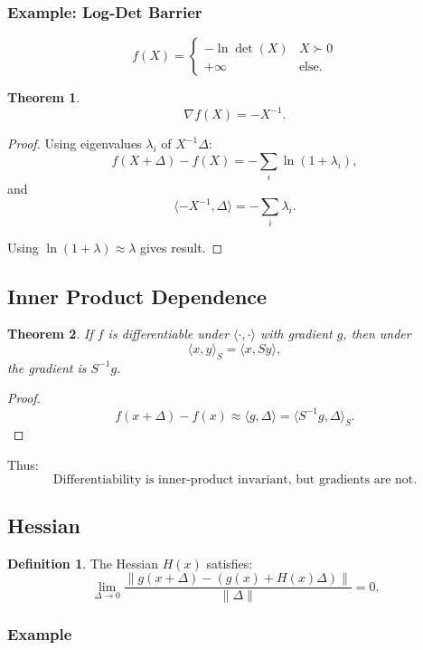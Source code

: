 \documentclass[12pt,oneside]{book}
\numberwithin{equation}{section}
\theoremstyle{definition}
\newtheorem{definition}{Definition}[section]
\theoremstyle{plain}
\newtheorem{theorem}{Theorem}[section]
\theoremstyle{remark}
\begin{document}
\subsubsection*{Example: Log-Det Barrier}

\[
f(X) =
\begin{cases}
-\ln \det(X) & X \succ 0 \\
+\infty & \text{else}.
\end{cases}
\]

\begin{theorem}
\[
\nabla f(X) = -X^{-1}.
\]
\end{theorem}

\begin{proof}
Using eigenvalues $\lambda_i$ of $X^{-1}\Delta$:
\[
f(X+\Delta) - f(X)
= -\sum_i \ln(1+\lambda_i),
\]
and
\[
\langle -X^{-1}, \Delta \rangle = -\sum_i \lambda_i.
\]

Using $\ln(1+\lambda) \approx \lambda$ gives result.
\end{proof}

\subsection*{Inner Product Dependence}

\begin{theorem}
If $f$ is differentiable under $\langle \cdot,\cdot \rangle$ with gradient $g$, then under
\[
\langle x,y \rangle_S = \langle x, S y \rangle,
\]
the gradient is $S^{-1} g$.
\end{theorem}

\begin{proof}
\[
f(x+\Delta) - f(x) \approx \langle g,\Delta \rangle
= \langle S^{-1} g, \Delta \rangle_S.
\]
\end{proof}

\noindent
Thus:
\[
\text{Differentiability is inner-product invariant, but gradients are not.}
\]

\subsection*{Hessian}

\begin{definition}
The Hessian $H(x)$ satisfies:
\[
\lim_{\Delta \to 0}
\frac{\|g(x+\Delta) - (g(x) + H(x)\Delta)\|}{\|\Delta\|} = 0.
\]
\end{definition}

\subsubsection*{Example}
\end{document}
